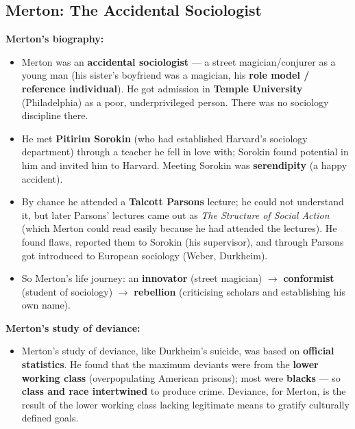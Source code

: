 \sectiondivider

\subsection{Merton: The Accidental Sociologist}

\begin{DataFact}
\textbf{Merton's biography:}
\begin{itemize}
\item Merton was an \textbf{accidental sociologist} --- a street magician/conjurer as a young man (his sister's boyfriend was a magician, his \textbf{role model / reference individual}). He got admission in \textbf{Temple University} (Philadelphia) as a poor, underprivileged person. There was no sociology discipline there.
\item He met \textbf{Pitirim Sorokin} (who had established Harvard's sociology department) through a teacher he fell in love with; Sorokin found potential in him and invited him to Harvard. Meeting Sorokin was \textbf{serendipity} (a happy accident).
\item By chance he attended a \textbf{Talcott Parsons} lecture; he could not understand it, but later Parsons' lectures came out as \textit{The Structure of Social Action} (which Merton could read easily because he had attended the lectures). He found flaws, reported them to Sorokin (his supervisor), and through Parsons got introduced to European sociology (Weber, Durkheim).
\item So Merton's life journey: an \textbf{innovator} (street magician) $\rightarrow$ \textbf{conformist} (student of sociology) $\rightarrow$ \textbf{rebellion} (criticising scholars and establishing his own name).
\end{itemize}
\end{DataFact}

\begin{DataFact}
\textbf{Merton's study of deviance:}
\begin{itemize}
\item Merton's study of deviance, like Durkheim's suicide, was based on \textbf{official statistics}. He found that the maximum deviants were from the \textbf{lower working class} (overpopulating American prisons); most were \textbf{blacks} --- so \textbf{class and race intertwined} to produce crime. Deviance, for Merton, is the result of the lower working class lacking legitimate means to gratify culturally defined goals.
\end{itemize}
\end{DataFact}

